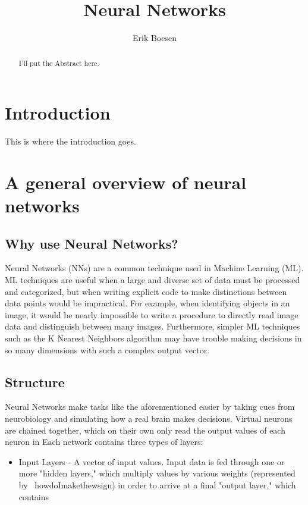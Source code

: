 \documentclass{article}
\begin{document}
\title{Neural Networks}
\author{Erik Boesen}

\maketitle

\begin{abstract}
I'll put the Abstract here.
\end{abstract}

\section{Introduction}
This is where the introduction goes.

\section{A general overview of neural networks}
\subsection{Why use Neural Networks?}
Neural Networks (NNs) are a common technique used in Machine Learning (ML). ML techniques are useful when a large and diverse set of data must be processed and categorized, but when writing explicit code to make distinctions between data points would be impractical. For example, when identifying objects in an image, it would be nearly impossible to write a procedure to directly read image data and distinguish between many images. Furthermore, simpler ML techniques such as the K Nearest Neighbors algorithm may have trouble making decisions in so many dimensions with such a complex output vector.

\subsection{Structure}
Neural Networks make tasks like the aforementioned easier by taking cues from neurobiology and simulating how a real brain makes decisions. Virtual neurons are chained together, which on their own only read the output values of each neuron in  Each network contains three types of layers:
\begin{itemize}
\item{Input Layers} - A vector of input values. Input data is fed through one or more "hidden layers," which multiply values by various weights (represented by \ howdoImakethewsign) in order to arrive at a final "output layer," which contains 
\end{itemize}
\end{document}
